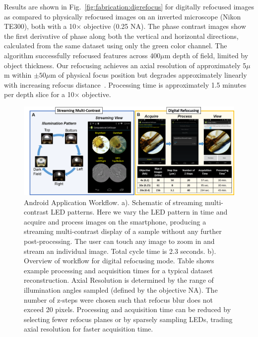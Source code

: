 Results are shown in Fig.~\ref{fig:fabrication:digrefocus} for digitally refocused images as compared to physically refocused images on an inverted microscope (Nikon TE300), both with a 10$\times$ objective (0.25 NA). The phase contrast images show the first derivative of phase along both the vertical and horizontal directions, calculated from the same dataset using only the green color channel. The algorithm successfully refocused features across 400$\mu$m depth of field, limited by object thickness. Our refocusing achieves an axial resolution of approximately 5$\mu$m within $\pm50\mu$m of physical focus position but degrades approximately linearly with increasing refocus distance~\cite{Tian14}. Processing time is approximately 1.5 minutes per depth slice for a 10$\times$ objective.

\begin{figure}
\begin{center}
\includegraphics[width=\textwidth]{figures/fig_ccs_app.png}
\end{center}
\caption {{Android Application Workflow.} {a).} Schematic of streaming multi-contrast LED patterns. Here we vary the LED pattern in time and acquire and process images on the smartphone, producing a streaming multi-contrast display of a sample without any further post-processing. The user can touch any image to zoom in and stream an individual image. Total cycle time is 2.3 seconds.
{b).} Overview of workflow for digital refocusing mode. Table shows example processing and acquisition times for a typical dataset reconstruction. Axial Resolution is determined by the range of illumination angles sampled (defined by the objective NA). The number of z-steps were chosen such that refocus blur does not exceed 20 pixels. Processing and acquisition time can be reduced by selecting fewer refocus planes or by sparsely sampling LEDs, trading axial resolution for faster acquisition time.}

\label{fig:fabrication:android}
\end{figure}

